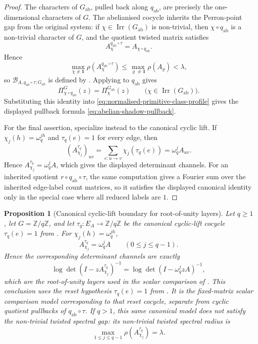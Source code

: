 \documentclass[11pt,a4paper]{amsart}
\theoremstyle{plain}
\newtheorem{proposition}[theorem]{Proposition}
\theoremstyle{definition}
\theoremstyle{remark}
\DeclareMathOperator{\Irr}{Irr}
\newcommand{\ZZ}{\mathbb{Z}}
\begin{document}
\begin{proof}
  The characters of \(G_{\mathrm{ab}}\), pulled back along
  \(q_{\mathrm{ab}}\), are precisely the one-dimensional characters of
  \(G\). The abelianised cocycle inherits the Perron-point gap from the
  original system:
  if \(\chi\in\Irr(G_{\mathrm{ab}})\) is non-trivial, then
  \(\chi\circ q_{\mathrm{ab}}\) is a non-trivial character of \(G\), and
  the quotient twisted matrix satisfies
  \[
    A_{\chi}^{q_{\mathrm{ab}}\circ\tau}
    =
    A_{\chi\circ q_{\mathrm{ab}}}.
  \]
  Hence
  \[
    \max_{\chi\neq\mathbf 1}
      \rho\!\left(A_{\chi}^{q_{\mathrm{ab}}\circ\tau}\right)
    \le
    \max_{\varrho\neq\mathbf 1}\rho(A_\varrho)
    <\lambda,
  \]
  so \(\mathcal B_{A,q_{\mathrm{ab}}\circ\tau;G_{\mathrm{ab}}}\) is
  defined by . Applying
   to \(q_{\mathrm{ab}}\)
  gives
  \[
    \Pi^{G}_{\chi\circ q_{\mathrm{ab}}}(z)
    =
    \Pi^{G_{\mathrm{ab}}}_{\chi}(z)
    \qquad
    \bigl(\chi\in\Irr(G_{\mathrm{ab}})\bigr).
  \]
  Substituting this identity into
  \eqref{eq:normalised-primitive-class-profile} gives the displayed
  pullback formula \eqref{eq:abelian-shadow-pullback}.

  For the final assertion, specialize instead to the canonical cyclic
  lift. If \(\chi_j(h)=\omega_q^{jh}\) and \(\tau_q(e)=1\) for every
  edge, then
  \[
    (A_{\chi_j}^{\tau_q})_{uv}
    =
    \sum_{e:u\to v}\chi_j(\tau_q(e))
    =
    \omega_q^j A_{uv}.
  \]
  Hence \(A_{\chi_j}^{\tau_q}=\omega_q^jA\), which gives the displayed
  determinant channels. For an inherited quotient
  \(r\circ q_{\mathrm{ab}}\circ\tau\), the same computation gives a
  Fourier sum over the inherited edge-label count matrices, so it
  satisfies the displayed canonical identity only in the special case
  where all reduced labels are \(1\).
\end{proof}

\begin{proposition}[Canonical cyclic-lift boundary for root-of-unity layers]
  \label{prop:canonical-cyclic-lift-root-layer}
  Let \(q\ge 1\), let \(G=\ZZ/q\ZZ\), and let
  \(\tau_q:E_A\to\ZZ/q\ZZ\) be the canonical cyclic-lift cocycle
  \(\tau_q(e)=1\) from . For
  \(\chi_j(h)=\omega_q^{jh}\),
  \[
    A_{\chi_j}^{\tau_q}=\omega_q^jA
    \qquad (0\le j\le q-1).
  \]
  Hence the corresponding determinant channels are exactly
  \[
    \log\det(I-zA_{\chi_j}^{\tau_q})^{-1}
    =
    \log\det(I-\omega_q^jzA)^{-1},
  \]
  which are the root-of-unity layers used in the scalar comparison of
  .
  This conclusion uses the reset hypothesis \(\tau_q(e)=1\) from
  .  It is the fixed-matrix scalar
  comparison model corresponding to that reset cocycle, separate from cyclic
  quotient pullbacks of \(q_{\mathrm{ab}}\circ\tau\).
  If \(q>1\), this same canonical model does not satisfy the non-trivial
  twisted spectral gap: its non-trivial twisted spectral radius is
  \[
    \max_{1\le j\le q-1}\rho(A_{\chi_j}^{\tau_q})=\lambda.
  \]
\end{proposition}
\end{document}
